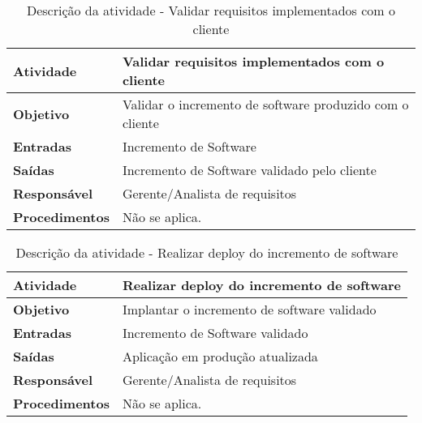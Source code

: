 \begin{table}[]
\centering
\caption{Descrição da atividade - Validar requisitos implementados com o cliente}
\begin{tabular}{|l|l|}
\hline
\textbf{Atividade}     & Validar requisitos implementados com o cliente           \\ \hline
\textbf{Objetivo}      & Validar o incremento de software produzido com o cliente \\ \hline
\textbf{Entradas}      & Incremento de Software                                   \\ \hline
\textbf{Saídas}        & Incremento de Software validado pelo cliente             \\ \hline
\textbf{Responsável}   & Gerente/Analista de requisitos                           \\ \hline
\textbf{Procedimentos} & Não se aplica.                                           \\ \hline
\end{tabular}
\end{table}

\begin{table}[]
\centering
\caption{Descrição da atividade - Realizar deploy do incremento de software}
\begin{tabular}{|l|l|}
\hline
\textbf{Atividade}     & Realizar deploy do incremento de software   \\ \hline
\textbf{Objetivo}      & Implantar o incremento de software validado \\ \hline
\textbf{Entradas}      & Incremento de Software validado             \\ \hline
\textbf{Saídas}        & Aplicação em produção atualizada            \\ \hline
\textbf{Responsável}   & Gerente/Analista de requisitos              \\ \hline
\textbf{Procedimentos} & Não se aplica.                              \\ \hline
\end{tabular}
\end{table}